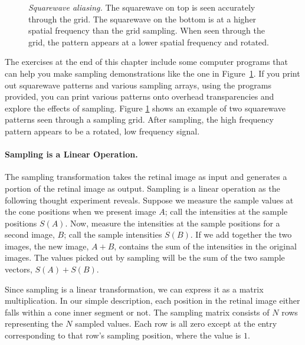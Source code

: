 \begin{figure}
\centerline{
}
\caption[Squarewave aliasing]{
{\em Squarewave aliasing.}
The squarewave on top is seen accurately
through the grid.
The squarewave on the bottom
is at a higher spatial frequency than the grid
sampling.
When seen through the grid,
the pattern appears at a lower spatial frequency
and rotated.
}
\label{f2:aliasExample}
\end{figure}
The exercises at the end of this chapter
include some computer programs
that can help you make sampling demonstrations like
the one in Figure~\ref{f2:aliasExample}.
If you print out squarewave patterns and various
sampling arrays, using the programs provided,
you can print various patterns onto
overhead transparencies and explore the effects
of sampling.
Figure \ref{f2:aliasExample} shows an example of
two squarewave patterns seen through a sampling grid.
After sampling, the high frequency pattern
appears to be a rotated, low frequency signal.

\paragraph{Sampling is a Linear Operation. }
The sampling transformation
takes the retinal image as input and generates
a portion of the retinal image as output.
Sampling is a linear operation as the following thought experiment reveals.
Suppose we measure the sample values at the cone
positions when we present image $A$;
call the intensities at the sample positions $S(A)$.
Now, measure the intensities at the sample positions for a second
image, $B$;
call the sample intensities $S(B)$.
If we add together the two images,
the new image, $A + B$, contains the sum of the intensities
in the original images.
The values picked out by sampling
will be the sum of the two sample vectors, $S(A) + S(B)$.

Since sampling is a linear transformation,
we can express it as a matrix multiplication.
In our simple description,
each position in the retinal image either
falls within a cone inner segment or not.
The sampling matrix consists of $N$ rows representing
the $N$ sampled values.
Each row is all zero except at the 
entry corresponding to that row's sampling position,
where the value is $1$.


